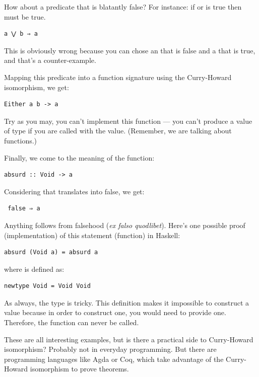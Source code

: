 How about a predicate that is blatantly false? For instance: if
 or  is true then  must be true.

\begin{verbatim}
a ⋁ b ⇒ a
\end{verbatim}

This is obviously wrong because you can chose an  that is
false and a  that is true, and that's a counter-example.

Mapping this predicate into a function signature using the Curry-Howard
isomorphism, we get:

\begin{verbatim}
Either a b -> a
\end{verbatim}

Try as you may, you can't implement this function --- you can't produce
a value of type  if you are called with the 
value. (Remember, we are talking about  functions.)

Finally, we come to the meaning of the  function:

\begin{verbatim}
absurd :: Void -> a
\end{verbatim}

Considering that  translates into false, we get:

\begin{verbatim}
 false ⇒ a
\end{verbatim}

Anything follows from falsehood (\emph{ex falso quodlibet}). Here's one
possible proof (implementation) of this statement (function) in Haskell:

\begin{verbatim}
absurd (Void a) = absurd a
\end{verbatim}

where  is defined as:

\begin{verbatim}
newtype Void = Void Void
\end{verbatim}

As always, the type  is tricky. This definition makes it
impossible to construct a value because in order to construct one, you
would need to provide one. Therefore, the function  can
never be called.

These are all interesting examples, but is there a practical side to
Curry-Howard isomorphism? Probably not in everyday programming. But
there are programming languages like Agda or Coq, which take advantage
of the Curry-Howard isomorphism to prove theorems.

